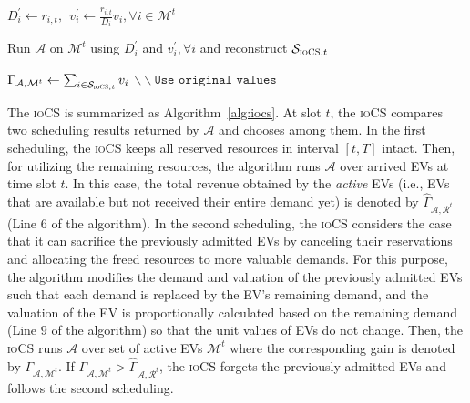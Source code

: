 \documentclass[journal]{IEEEtran}
\newcommand{\iocs}{\textsc{ioCS}\xspace}
\begin{document}
\begin{algorithm}
$D_i^\prime\leftarrow r_{i,t},\ \ v_i^\prime\leftarrow \frac{r_{i,t}}{D_i}v_i, \forall i\in\mathcal{M}^t$


Run $\mathcal{A}$ on $\mathcal{M}^t$ using $D_i^\prime$ and $v_i^\prime, \forall i$ and reconstruct $\mathcal{S}_{\iocs,t}$

$\Gamma_{\mathcal{A},\mathcal{M}^t}\leftarrow \sum_{i\in\mathcal{S}_{\iocs,t}}v_i$ $\backslash\backslash\texttt{Use original values}$




\end{algorithm}

The \iocs is summarized as Algorithm~\ref{alg:iocs}. At slot $t$, the \iocs compares two scheduling results returned by $\mathcal{A}$ and chooses among them. In the first scheduling, the \iocs keeps all reserved resources in interval $[t,T]$ intact. Then, for utilizing the remaining resources, the algorithm runs $\mathcal{A}$ over arrived EVs at time slot $t$. In this case, the total revenue obtained by the \emph{active} EVs (i.e., EVs that are available but not received their entire demand yet) is denoted by $\widehat{\Gamma}_{\mathcal{A},\mathcal{R}^t}$ (Line $6$ of the algorithm). In the second scheduling, the \iocs considers the case that it can sacrifice the previously admitted EVs by canceling their reservations and allocating the freed resources to more valuable demands. For this purpose, the algorithm modifies the demand and valuation of the previously admitted EVs such that each demand is replaced by the EV's remaining demand, and the valuation of the EV is proportionally calculated based on the remaining demand (Line $9$ of the algorithm) so that the unit values of EVs do not change. Then, the \iocs runs $\mathcal{A}$ over set of active EVs $\mathcal{M}^t$ where the corresponding gain is denoted by $\Gamma_{\mathcal{A},\mathcal{M}^t}$. If $\Gamma_{\mathcal{A},\mathcal{M}^t}>\widehat{\Gamma}_{\mathcal{A},\mathcal{R}^t}$, the \iocs forgets the previously admitted EVs and follows the second scheduling. 
\end{document}
